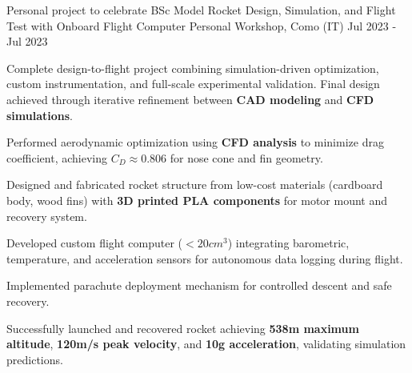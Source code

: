 
\cventry
{Personal project to celebrate BSc}
{Model Rocket Design, Simulation, and Flight Test with Onboard Flight Computer}
{Personal Workshop, Como (IT)}
{Jul 2023 - Jul 2023}
{
    Complete design-to-flight project combining simulation-driven optimization, custom instrumentation, and full-scale experimental validation.
    Final design achieved through iterative refinement between \textbf{CAD modeling} and \textbf{CFD simulations}.
    \newline
    \vspace{4mm}
    \begin{cvitems}
        \item {Performed aerodynamic optimization using \textbf{CFD analysis} to minimize drag coefficient, achieving \textbf{$C_D \approx 0.806$} for nose cone and fin geometry.}
        \item {Designed and fabricated rocket structure from low-cost materials (cardboard body, wood fins) with \textbf{3D printed PLA components} for motor mount and recovery system.}
        \item {Developed custom flight computer ($< 20cm^3$) integrating barometric, temperature, and acceleration sensors for autonomous data logging during flight.}
        \item {Implemented parachute deployment mechanism for controlled descent and safe recovery.}
        \item {Successfully launched and recovered rocket achieving \textbf{538m maximum altitude}, \textbf{120m/s peak velocity}, and \textbf{10g acceleration}, validating simulation predictions.}
    \end{cvitems}
}